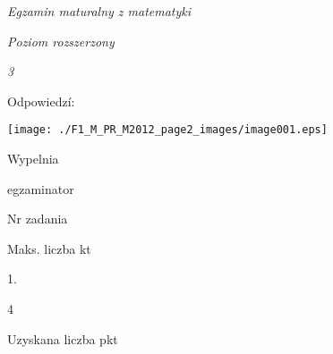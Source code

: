 \documentclass[a4paper,12pt]{article}
\begin{document}
{\it Egzamin maturalny z matematyki}

{\it Poziom rozszerzony}

{\it 3}

Odpowiedzí:
\begin{center}
\texttt{[image: ./F1\_M\_PR\_M2012\_page2\_images/image001.eps]}
\end{center}
Wypelnia

egzaminator

Nr zadania

Maks. liczba kt

1.

4

Uzyskana liczba pkt
\end{document}
